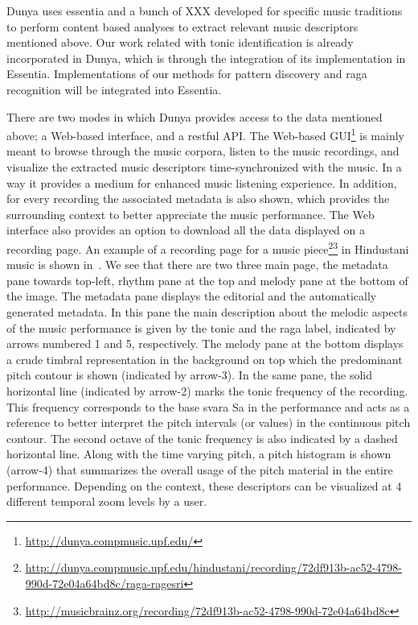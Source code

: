 Dunya uses \gls{essentia} and a bunch of XXX developed for specific music traditions  to perform content based analyses to extract relevant music descriptors mentioned above. Our work related with tonic identification is already incorporated in Dunya, which is through the integration of its implementation in Essentia. Implementations of our methods for pattern discovery and \gls{raga} recognition will be integrated into Essentia. 

There are two modes in which Dunya provides access to the data mentioned above; a Web-based interface, and a restful API. The Web-based GUI\footnote{\url{http://dunya.compmusic.upf.edu/}} is mainly meant to browse through the music corpora, listen to the music recordings, and visualize the extracted music descriptors time-synchronized with the music. In a way it provides a medium for enhanced music listening experience. In addition, for every recording the associated metadata is also shown, which provides the surrounding context to better appreciate the music performance. The Web interface also provides an option to download all the data displayed on a recording page. An example of a recording page for a music piece\footnote{\url{http://dunya.compmusic.upf.edu/hindustani/recording/72df913b-ac52-4798-990d-72e04a64bd8c/raga-ragesri}}\footnote{\url{http://musicbrainz.org/recording/72df913b-ac52-4798-990d-72e04a64bd8c}} in Hindustani music is shown in~. We see that there are two three main page, the metadata pane towards top-left, rhythm pane at the top and melody pane at the bottom of the image. The metadata pane displays the editorial and the automatically generated metadata. In this pane the main description about the melodic aspects of the music performance is given by the tonic and the \gls{raga} label, indicated by arrows numbered 1 and 5, respectively. The melody pane at the bottom displays a crude timbral representation in the background on top which the predominant pitch contour is shown (indicated by arrow-3).  In the same pane, the solid horizontal line (indicated by arrow-2) marks the tonic frequency of the recording. This frequency corresponds to the base \gls{svara} Sa in the performance and acts as a reference to better interpret the pitch intervals (or values) in the continuous pitch contour. The second octave of the tonic frequency is also indicated by a dashed horizontal line. Along with the time varying pitch, a pitch histogram is shown (arrow-4) that summarizes the overall usage of the pitch material in the entire performance. Depending on the context, these descriptors can be visualized at 4 different temporal zoom levels by a user. 


